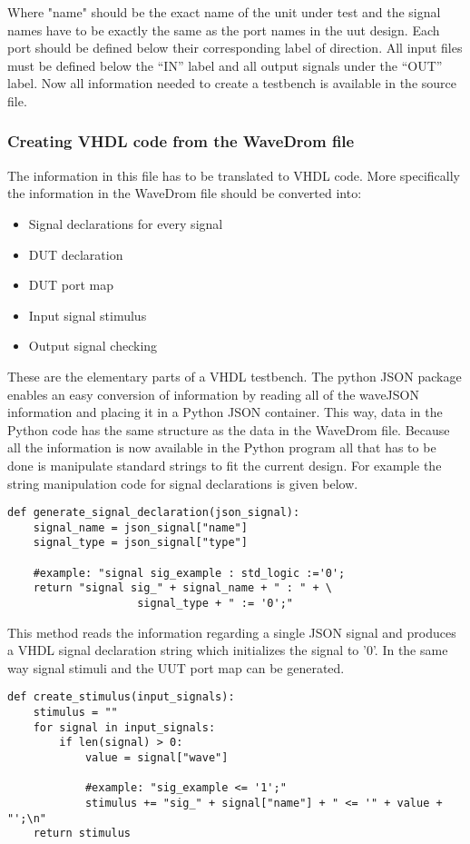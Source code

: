 Where "name" should be the exact name of the unit under test and the signal names have to be exactly the same as the port names in the uut design. Each port should be defined below their corresponding label of direction. All input files must be defined below the “IN” label and all output signals under the “OUT” label. Now all information needed to create a testbench is available in the source file.
\subsubsection{Creating VHDL code from the WaveDrom file}\label{TD:vhdl_creation}
The information in this file has to be translated to VHDL code. More specifically the information in the WaveDrom file should be converted into:
\begin{itemize}
	\item Signal declarations for every signal
	\item DUT declaration
	\item DUT port map
	\item Input signal stimulus
	\item Output signal checking
\end{itemize}\noindent
These are the elementary parts of a VHDL testbench. The python JSON package enables an easy conversion of information by reading all of the waveJSON information and placing it in a Python JSON container. This way, data in the Python code has the same structure as the data in the WaveDrom file. Because all the information is now available in the Python program all that has to be done is manipulate standard strings to fit the current design.
\newpage
For example the string manipulation code for signal declarations is given below. 
\begin{lstlisting}[style=python, caption={Generating signal declarations in Python}, label={python:signal_declaration}]
def generate_signal_declaration(json_signal):
	signal_name = json_signal["name"]
	signal_type = json_signal["type"]
	
	#example: "signal sig_example : std_logic :='0';
	return "signal sig_" + signal_name + " : " + \
					signal_type + " := '0';"
\end{lstlisting}\noindent
This method reads the information regarding a single JSON signal and produces a VHDL signal declaration string which initializes the signal to '0'.
\npar
In the same way signal stimuli and the UUT port map can be generated.
\begin{lstlisting}[style=python, caption={Generating signal stimuli in Python}, label={python:signal_stimuli}]
def create_stimulus(input_signals):
	stimulus = ""
	for signal in input_signals:
		if len(signal) > 0:
			value = signal["wave"]
			
			#example: "sig_example <= '1';"
			stimulus += "sig_" + signal["name"] + " <= '" + value + "';\n"
	return stimulus
\end{lstlisting}\noindent

